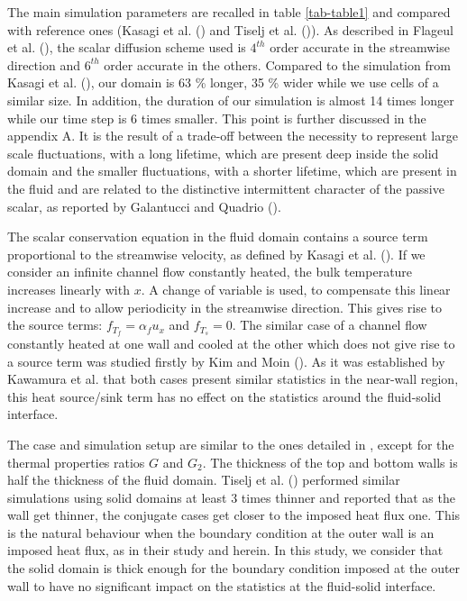 \documentclass[review]{elsarticle}
\begin{document}
The main simulation parameters are recalled in table \ref{tab-table1} and compared with reference ones (Kasagi et al. (\cite{kasagi1992direct}) and Tiselj et al. (\cite{Tiselj2001dns})).
As described in Flageul et al. (\cite{flageul2015dns}), the scalar diffusion scheme used is $4^{th}$ order accurate in the streamwise direction and $6^{th}$ order accurate in the others.
{\color{red} Compared to the simulation from Kasagi et al. (\cite{kasagi1992direct}), our domain is 63 \% longer, 35 \% wider  while we use cells of a similar size.
In addition, the duration of our simulation is almost 14 times longer while our time step is 6 times smaller.
This point is further discussed in the appendix A.
It is the result of a trade-off between the necessity to represent large scale fluctuations, with a long lifetime, which are present deep inside the solid domain and the smaller fluctuations, with a shorter lifetime, which are present in the fluid and are related to the distinctive intermittent character of the passive scalar, as reported by Galantucci and Quadrio (\cite{galantucci2010very}).}

The scalar conservation equation in the fluid domain contains a source term proportional to the streamwise velocity, as defined by Kasagi et al. (\cite{kasagi1992direct}).
{\color{red} If we consider an infinite channel flow constantly heated, the bulk temperature increases linearly with $x$.
A change of variable is used, to compensate this linear increase and to allow periodicity in the streamwise direction.
This gives rise to the source terms: $f_{T_f} = \alpha_f u_x$ and $f_{T_s} = 0$.
The similar case of a channel flow constantly heated at one wall and cooled at the other which does not give rise to a source term was studied firstly by Kim and Moin (\cite{kim1989transport}).
As it was established by Kawamura et al. \cite{kawamura2000dns} that both cases present similar statistics in the near-wall region, this heat source/sink term has no effect on the statistics around the fluid-solid interface.}

The case and simulation setup are similar to the ones detailed in \cite{flageul2015dns}, except for the thermal properties ratios $G$ and $G_2$.
{\color{red} The thickness of the top and bottom walls is half the thickness of the fluid domain.
Tiselj et al. (\cite{Tiselj2001dns}) performed similar simulations using solid domains at least 3 times thinner and reported that as the wall get thinner, the conjugate cases get closer to the imposed heat flux one.
This is the natural behaviour when the boundary condition at the outer wall is an imposed heat flux, as in their study and herein.
In this study, we consider that the solid domain is thick enough for the boundary condition imposed at the outer wall to have no significant impact on the statistics at the fluid-solid interface.}
\end{document}
